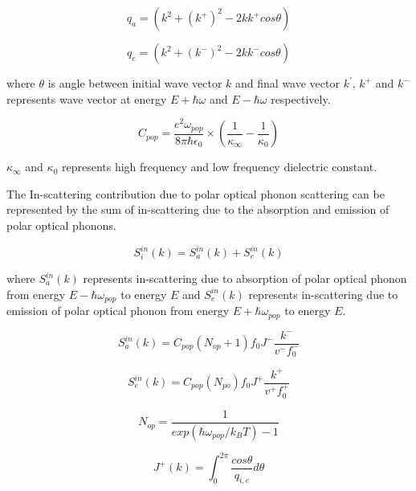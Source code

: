 \documentclass[12pt]{article}
\begin{document}
\begin{equation}
q_{a} = \left( k^2 + \left( k^{+}\right)^2 - 2k k^{+} cos \theta \right)
\label{q_ab}
\end{equation}

\begin{equation}
q_{e} = \left( k^2 + \left( k^{-}\right)^2 - 2k k^{-} cos \theta \right)
\label{q_em}
\end{equation}

where $\theta $ is angle between initial wave vector $k$ and final wave vector $k^{'}$, $k^+$ and $k^-$ represents wave vector at energy $E+ \hbar \omega$ and $E- \hbar \omega$ respectively.

\begin{equation}
C_{pop} = \frac{e^2 \omega_{pop}}{8 \pi \hbar \epsilon_0} \times \left( \frac{1}{\kappa_{\infty}} - \frac{1}{\kappa_0} \right) 
\label{pop_const}
\end{equation}

$\kappa_{\infty}$ and $\kappa_{0}$ represents high frequency and low frequency dielectric constant.
 
The In-scattering contribution due to polar optical phonon scattering can be represented by the sum of in-scattering due to the absorption and emission of polar optical phonons. 

\begin{equation}
S_i^{in}(k) = S_a^{in}(k) + S_e^{in}(k)
\label{in_sc_pop}
\end{equation}

where $S_a^{in}(k)$ represents in-scattering due to absorption of polar optical phonon from energy $E-\hbar \omega_{pop}$ to energy $E$ and $S_e^{in}(k)$ represents in-scattering due to emission of polar optical phonon from energy $E+\hbar \omega_{pop}$ to energy $E$.
   
\begin{equation}
S_{a}^{in}(k) = C_{pop} (N_{op}+1) f_{0}  J^- \frac{k^-}{v ^-f_{0}^-}
\label{ab_in_sc_pop}
\end{equation}

\begin{equation}
S_{e}^{in}(k) = C_{pop} (N_{po}) f_{0}  J^+\frac{k^+}{v^+ f_{0}^+}
\label{ab_in_sc_pop}
\end{equation}


\begin{equation}
N_{op} = \frac{1}{exp(\hbar\omega_{pop}/k_B T) - 1}
\label{N}
\end{equation}

\begin{equation}
J^{+}(k) = \int_0^{2\pi} \frac{cos \theta}{q_{i,e}}  d\theta 
\label{J_plus}
\end{equation}
\end{document}
